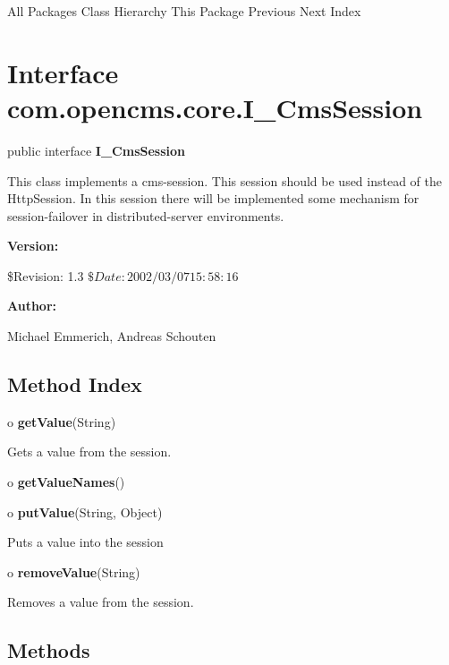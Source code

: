 \begin{PRE}
All Packages  Class Hierarchy  This Package  Previous  Next  Index
\end{PRE}

\htmlHR

\section*{  Interface com.opencms.core.I\_CmsSession }

\begin{description}
\item public interface {\bf I\_CmsSession} 
\end{description}

This class implements a cms-session. This session should be used instead of
the HttpSession. In this session there will be implemented some mechanism for
session-failover in distributed-server environments. 

\begin{description}
\item {\bf Version:}  

\$Revision: 1.3 $ \$Date: 2002/03/07 15:58:16 $  
\item {\bf Author:}  

Michael Emmerich, Andreas Schouten 
\end{description}

\htmlHR

\subsection*{  Method Index }

\begin{description}
\item o {\bf getValue}(String)  

Gets a value from the session.  
\item o {\bf getValueNames}()  

\item o {\bf putValue}(String, Object)  

Puts a value into the session  
\item o {\bf removeValue}(String)  

Removes a value from the session. 
\end{description}

\subsection*{  Methods }

